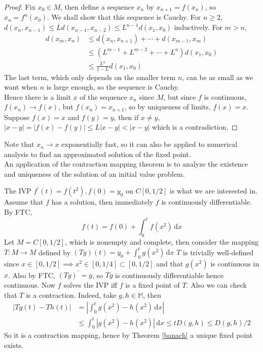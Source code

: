 \begin{proof}
    Fix $x_0\in M$, then define a sequence $x_n$ by $x_{n+1}=f(x_n)$, so $x_n=f^n(x_0)$.
    We shall show that this sequence is Cauchy.
    For $n\ge 2$, $d(x_n,x_{n-1})\le Ld(x_{n-1},x_{n-2})\le L^{n-1}d(x_1,x_0)$ inductively.
    For $m>n$, 
    \begin{align*}
        d(x_m,x_n)&\le d(x_n,x_{n+1})+\cdots+d(x_{m-1},x_m)\\
        &\le(L^{m-1}+L^{m-2}+\cdots+L^n)d(x_1,x_0)\\
        &\le\frac{L^n}{1-L}d(x_1,x_0)
    \end{align*}
    The last term, which only depends on the smaller term $n$, can be as small as we want when $n$ is large enough, so the sequence is Cauchy.\\
    Hence there is a limit $x$ of the sequence $x_n$ since $M$, but since $f$ is continuous, $f(x_n)\to f(x)$, but $f(x_n)=x_{n+1}$, so by uniqueness of limits, $f(x)=x$.\\
    Suppose $f(x)=x$ and $f(y)=y$, then if $x\neq y$, $|x-y|=|f(x)-f(y)|\le L|x-y|<|x-y|$ which is a contradiction.
\end{proof}
Note that $x_n\to x$ exponentially fast, so it can also be applied to numerical analysis to find an approximated solution of the fixed point.\\
An application of the contraction mapping theorem is to analyze the existence and uniqueness of the solution of an initial value problem.
\begin{example}
    The IVP $f^\prime(t)=f(t^2), f(0)=y_0$ on $C[0,1/2]$ is what we are interested in.
    Assume that $f$ has a solution, then immediately $f$ is continuously differentiable.
    By FTC,
    $$f(t)=f(0)+\int_0^tf(x^2)\,\mathrm dx$$
    Let $M=C[0,1/2]$, which is nonempty and complete, then consider the mapping $T:M\to M$ defined by
    $(Tg)(t)=y_0+\int_0^tg(x^2)\,\mathrm dx$
    $T$ is trivially well-defined since $x\in [0,1/2]\implies x^2\in[0,1/4]\subset[0,1/2]$ and that $g(x^2)$ is continuous in $x$. Also by FTC, $(Tg)^\prime=g$, so $Tg$ is continuously differentiable hence continuous.
    Now $f$ solves the IVP iff $f$ is a fixed point of $T$.
    Also we can check that $T$ is a contraction.
    Indeed, take $g,h\in\mathbb M$, then
    \begin{align*}
        |Tg(t)-Th(t)|&=\left|\int_0^tg(x^2)-h(x^2)\,\mathrm dx\right|\\
        &\le\int_0^t|g(x^2)-h(x^2)|\,\mathrm dx\le tD(g,h)\le D(g,h)/2
    \end{align*}
    So it is a contraction mapping, hence by Theorem \ref{banach} a unique fixed point exists.
\end{example}
